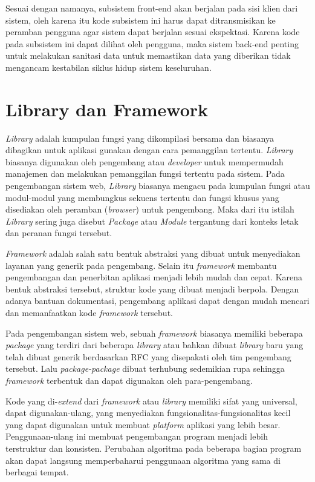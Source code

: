     Sesuai dengan namanya, subsistem front-end akan berjalan pada sisi klien dari
    sistem, oleh karena itu kode subsistem ini harus dapat ditransmisikan 
    ke peramban pengguna agar sistem dapat berjalan sesuai ekspektasi. Karena kode
    pada subsistem ini dapat dilihat oleh pengguna, maka sistem back-end penting untuk
    melakukan sanitasi data untuk memastikan data yang diberikan tidak mengancam
    kestabilan siklus hidup sistem keseluruhan.

\section{Library dan Framework}
    \textit{Library} adalah kumpulan fungsi yang dikompilasi bersama dan
    biasanya dibagikan untuk aplikasi gunakan dengan cara pemanggilan tertentu.
    \textit{Library} biasanya digunakan oleh pengembang atau \emph{developer}
    untuk mempermudah manajemen dan melakukan pemanggilan fungsi tertentu pada
    sistem. Pada pengembangan sistem web, \textit{Library} biasanya mengacu pada
    kumpulan fungsi atau modul-modul yang membungkus sekuens tertentu dan fungsi
    khusus yang disediakan oleh peramban (\textit{browser}) untuk pengembang.
    Maka dari itu istilah \textit{Library} sering juga disebut \textit{Package}
    atau \textit{Module} tergantung dari konteks letak dan peranan fungsi
    tersebut\cite{npm-docs:packages-n-modules}\cite{node-docs:CommonJS-modules}.
    
    \textit{Framework} adalah salah satu bentuk abstraksi yang dibuat untuk
    menyediakan layanan yang generik pada pengembang. Selain itu
    \textit{framework} membantu pengembangan dan penerbitan aplikasi menjadi
    lebih mudah dan cepat. Karena bentuk abstraksi tersebut, struktur kode yang
    dibuat menjadi berpola. Dengan adanya bantuan dokumentasi, pengembang
    aplikasi dapat dengan mudah mencari dan memanfaatkan kode \textit{framework}
    tersebut.
    
    Pada pengembangan sistem web, sebuah \textit{framework} biasanya memiliki
    beberapa \textit{package} yang terdiri dari beberapa \textit{library} atau
    bahkan dibuat \textit{library} baru yang telah dibuat generik berdasarkan
    RFC yang disepakati oleh tim pengembang tersebut\cite{reactjs:rfc}. Lalu
    \textit{package-package} dibuat terhubung sedemikian rupa sehingga
    \textit{framework} terbentuk dan dapat digunakan oleh para-pengembang.
    
    Kode yang di-\textit{extend} dari \textit{framework} atau \textit{library} 
    memiliki sifat yang universal, dapat digunakan-ulang, yang menyediakan
    fungsionalitas-fungsionalitas kecil yang dapat digunakan untuk membuat
    \textit{platform} aplikasi yang lebih besar. Penggunaan-ulang ini membuat
    pengembangan program menjadi lebih terstruktur dan konsisten. Perubahan
    algoritma pada beberapa bagian program akan dapat langsung memperbaharui
    penggunaan algoritma yang sama di berbagai tempat.
    

